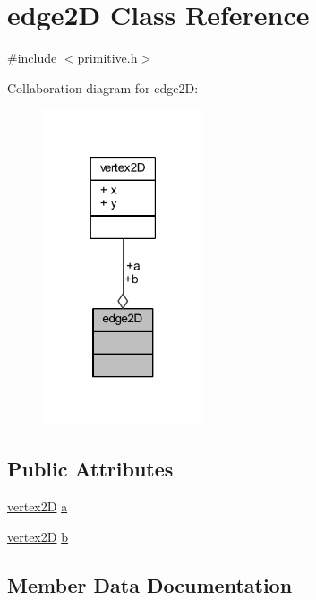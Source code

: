 \hypertarget{classedge2_d}{}\section{edge2D Class Reference}
\label{classedge2_d}


{\ttfamily \#include $<$primitive.\+h$>$}



Collaboration diagram for edge2D\+:
\nopagebreak
\begin{figure}[H]
\begin{center}
\leavevmode
\includegraphics[width=134pt]{classedge2_d__coll__graph}
\end{center}
\end{figure}
\subsection*{Public Attributes}
\begin{DoxyCompactItemize}
\item 
\mbox{\hyperlink{classvertex2_d}{vertex2D}} \mbox{\hyperlink{classedge2_d_a2f62b09a7626de5187523ecc359487fd}{a}}
\item 
\mbox{\hyperlink{classvertex2_d}{vertex2D}} \mbox{\hyperlink{classedge2_d_a34a5d6f487b0935992736b14ef7abe21}{b}}
\end{DoxyCompactItemize}


\subsection{Member Data Documentation}
\mbox{\label{classedge2_d_a2f62b09a7626de5187523ecc359487fd}} 
